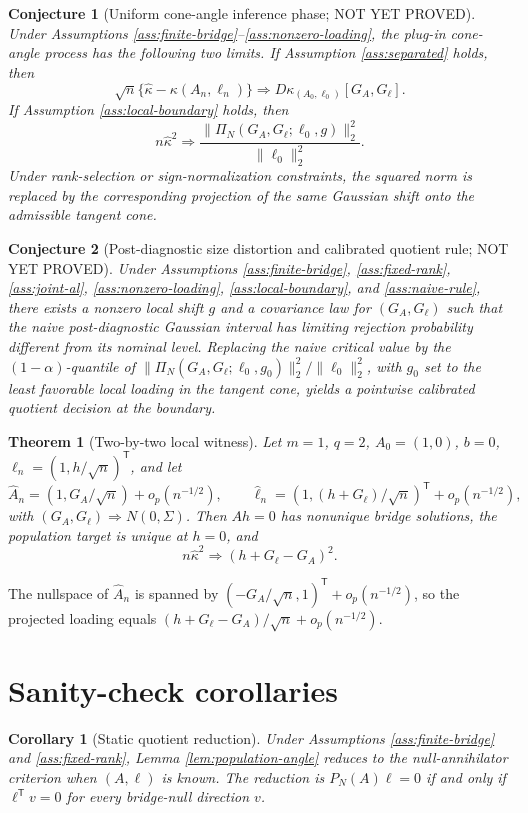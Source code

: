 \documentclass[11pt]{article}
\newcommand{\transpose}{\mathsf{T}}
\theoremstyle{definition}
\theoremstyle{plain}
\newtheorem{theorem}{Theorem}
\newtheorem{conjecture}{Conjecture}
\newtheorem{corollary}{Corollary}
\theoremstyle{remark}
\begin{document}
\begin{conjecture}[Uniform cone-angle inference phase; NOT YET PROVED]\label{conj:regular-local}
Under Assumptions \ref{ass:finite-bridge}--\ref{ass:nonzero-loading}, the plug-in cone-angle process has the following two limits. If Assumption \ref{ass:separated} holds, then
\[
        \sqrt n\{\widehat\kappa-\kappa(A_n,\ell_n)\}
        \Rightarrow D\kappa_{(A_0,\ell_0)}[G_A,G_\ell].
\]
If Assumption \ref{ass:local-boundary} holds, then
\[
        n\widehat\kappa^2
        \Rightarrow
        \frac{\|\Pi_N(G_A,G_\ell;\ell_0,g)\|_2^2}{\|\ell_0\|_2^2}.
\]
Under rank-selection or sign-normalization constraints, the squared norm is replaced by the corresponding projection of the same Gaussian shift onto the admissible tangent cone.
\end{conjecture}

\begin{conjecture}[Post-diagnostic size distortion and calibrated quotient rule; NOT YET PROVED]\label{conj:pretest}
Under Assumptions \ref{ass:finite-bridge}, \ref{ass:fixed-rank}, \ref{ass:joint-al}, \ref{ass:nonzero-loading}, \ref{ass:local-boundary}, and \ref{ass:naive-rule}, there exists a nonzero local shift \(g\) and a covariance law for \((G_A,G_\ell)\) such that the naive post-diagnostic Gaussian interval has limiting rejection probability different from its nominal level. Replacing the naive critical value by the \((1-\alpha)\)-quantile of \(\|\Pi_N(G_A,G_\ell;\ell_0,g_0)\|_2^2/\|\ell_0\|_2^2\), with \(g_0\) set to the least favorable local loading in the tangent cone, yields a pointwise calibrated quotient decision at the boundary.
\end{conjecture}

\begin{theorem}[Two-by-two local witness]\label{thm:witness}
Let \(m=1\), \(q=2\), \(A_0=(1,0)\), \(b=0\), \(\ell_n=(1,h/\sqrt n)^\transpose\), and let
\[
        \widehat A_n=(1,G_A/\sqrt n)+o_p(n^{-1/2}),\qquad
        \widehat\ell_n=(1,(h+G_\ell)/\sqrt n)^\transpose+o_p(n^{-1/2}),
\]
with \((G_A,G_\ell)\Rightarrow N(0,\Sigma)\). Then \(Ah=0\) has nonunique bridge solutions, the population target is unique at \(h=0\), and
\[
        n\widehat\kappa^2\Rightarrow (h+G_\ell-G_A)^2 .
\]
\end{theorem}
The nullspace of \(\widehat A_n\) is spanned by \((-G_A/\sqrt n,1)^\transpose+o_p(n^{-1/2})\), so the projected loading equals \((h+G_\ell-G_A)/\sqrt n+o_p(n^{-1/2})\).

\section{Sanity-check corollaries}
\begin{corollary}[Static quotient reduction]
Under Assumptions \ref{ass:finite-bridge} and \ref{ass:fixed-rank}, Lemma \ref{lem:population-angle} reduces to the null-annihilator criterion when \((A,\ell)\) is known. The reduction is \(P_N(A)\ell=0\) if and only if \(\ell^\transpose v=0\) for every bridge-null direction \(v\).
\end{corollary}
\end{document}
